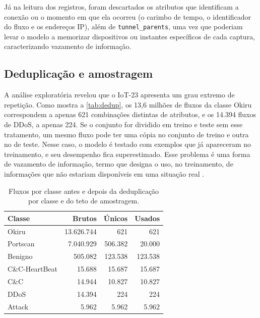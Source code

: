 \documentclass[alpha-refs,brazilian]{CC-EC_TF-TC}
\begin{document}
Já na leitura dos registros, foram descartados os atributos que identificam a conexão ou o momento em que ela ocorreu (o carimbo de tempo, o identificador do fluxo e os endereços IP), além de \texttt{tunnel\_parents}, uma vez que poderiam levar o modelo a memorizar dispositivos ou instantes específicos de cada captura, caracterizando vazamento de informação.

\subsection{Deduplicação e amostragem}
\label{sec:dedup}

A análise exploratória revelou que o IoT-23 apresenta um grau extremo de repetição. Como mostra a \autoref{tab:dedup}, os 13,6 milhões de fluxos da classe Okiru correspondem a apenas 621 combinações distintas de atributos, e os 14.394 fluxos de DDoS, a apenas 224. Se o conjunto for dividido em treino e teste sem esse tratamento, um mesmo fluxo pode ter uma cópia no conjunto de treino e outra no de teste. Nesse caso, o modelo é testado com exemplos que já apareceram no treinamento, e seu desempenho fica superestimado. Esse problema é uma forma de vazamento de informação, termo que designa o uso, no treinamento, de informações que não estariam disponíveis em uma situação real \citep{kapoor2023leakage}.

\begin{table}[htbp]
\centering
\caption{Fluxos por classe antes e depois da deduplicação por classe e do teto de amostragem.}
\label{tab:dedup}
\small
\begin{tabular}{lrrr}
\toprule
\textbf{Classe} & \textbf{Brutos} & \textbf{Únicos} & \textbf{Usados} \\
\midrule
Okiru           & 13.626.744 &     621 &     621 \\
Portscan        &  7.040.929 & 506.382 &  20.000 \\
Benigno         &    505.082 & 123.538 & 123.538 \\
C\&C-HeartBeat  &     15.688 &  15.687 &  15.687 \\
C\&C            &     14.944 &  10.827 &  10.827 \\
DDoS            &     14.394 &     224 &     224 \\
Attack          &      5.962 &   5.962 &   5.962 \\
\bottomrule
\end{tabular}
\end{table}
\end{document}
